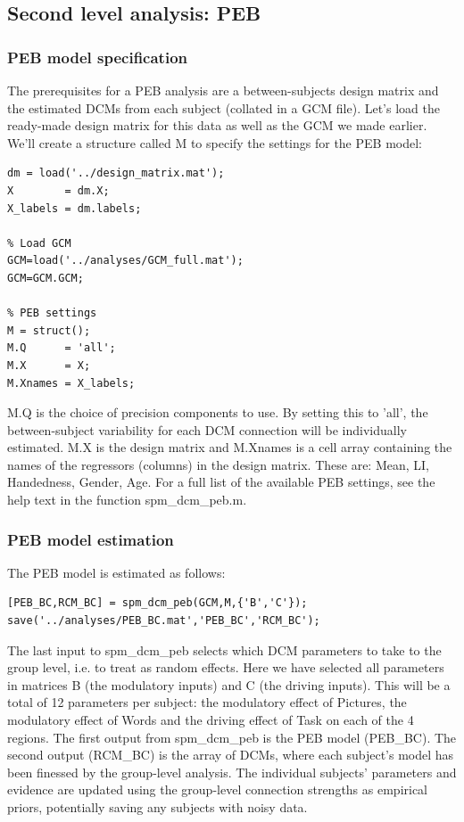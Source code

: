 \documentclass{article}
\begin{document}
\subsection{Second level analysis: PEB}

\subsubsection{PEB model specification}
The prerequisites for a PEB analysis are a between-subjects design matrix and the estimated DCMs from each subject (collated in a GCM file). Let's load the ready-made design matrix for this data as well as the GCM we made earlier. We'll create a structure called M to specify the settings for the PEB model:

\begin{lstlisting}[style=Matlab-editor,caption=PEB specification]
% Load design matrix
dm = load('../design_matrix.mat');
X        = dm.X;
X_labels = dm.labels;

% Load GCM
GCM=load('../analyses/GCM_full.mat');
GCM=GCM.GCM;

% PEB settings
M = struct();
M.Q      = 'all';
M.X      = X;
M.Xnames = X_labels;
\end{lstlisting}

M.Q is the choice of precision components to use. By setting this to 'all', the between-subject variability for each DCM connection will be individually estimated. M.X is the design matrix and M.Xnames is a cell array containing the names of the regressors (columns) in the design matrix. These are: Mean, LI, Handedness, Gender, Age. For a full list of the available PEB settings, see the help text in the function spm\_dcm\_peb.m. 

\subsubsection{PEB model estimation}
The PEB model is estimated as follows:

\begin{lstlisting}[style=Matlab-editor,caption=PEB estimation]
[PEB_BC,RCM_BC] = spm_dcm_peb(GCM,M,{'B','C'});
save('../analyses/PEB_BC.mat','PEB_BC','RCM_BC');
\end{lstlisting}

The last input to spm\_dcm\_peb selects which DCM parameters to take to the group level, i.e. to treat as random effects. Here we have selected all parameters in matrices B (the modulatory inputs) and C (the driving inputs). This will be a total of 12 parameters per subject: the modulatory effect of Pictures, the modulatory effect of Words and the driving effect of Task on each of the 4 regions. The first output from spm\_dcm\_peb is the PEB model (PEB\_BC). The second output (RCM\_BC) is the array of DCMs, where each subject's model has been finessed by the group-level analysis. The individual subjects' parameters and evidence are updated using the group-level connection strengths as empirical priors, potentially saving any subjects with noisy data.
\end{document}
